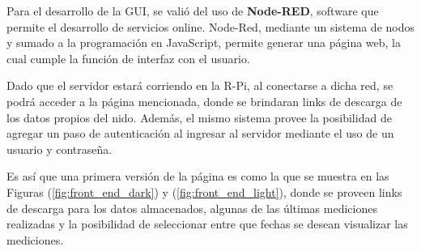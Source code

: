 Para el desarrollo de la GUI, se valió del uso de \textbf{Node-RED}, software que permite el desarrollo de servicios online. Node-Red, mediante un sistema de nodos y sumado a la programación en JavaScript, permite generar una página web, la cual cumple la función de interfaz con el usuario.

Dado que el servidor estará corriendo en la R-Pi, al conectarse a dicha red, se podrá acceder a la página mencionada, donde se brindaran links de descarga de los datos propios del nido. Además, el mismo sistema provee la posibilidad de agregar un paso de autenticación al ingresar al servidor mediante el uso de un usuario y contraseña. 

Es así que una primera versión de la página es como la que se muestra en las Figuras (\ref{fig:front_end_dark}) y (\ref{fig:front_end_light}), donde se proveen links de descarga para los datos almacenados, algunas de las últimas mediciones realizadas y la posibilidad de seleccionar entre que fechas se desean visualizar las mediciones.

